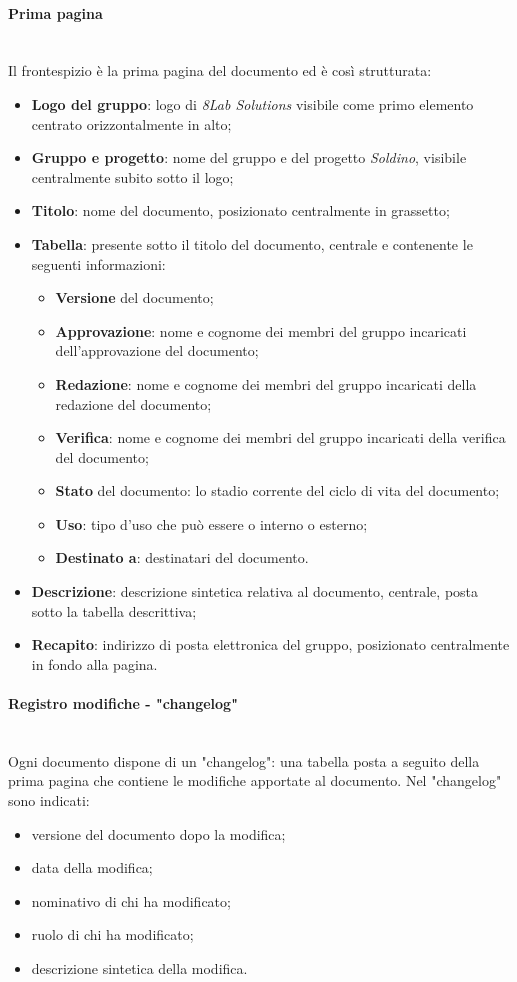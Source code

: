 		\paragraph{Prima pagina} \mbox{}\\
		Il frontespizio è la prima pagina del documento ed è così strutturata:
		\begin{itemize}
			\item \textbf{Logo del gruppo}: logo di \textit{8Lab Solutions} visibile come primo elemento centrato orizzontalmente in alto;
			\item \textbf{Gruppo e progetto}: nome del gruppo e del progetto \textit{Soldino}, visibile centralmente subito sotto il logo;
			\item \textbf{Titolo}: nome del documento, posizionato centralmente in grassetto;
			\item \textbf{Tabella}: presente sotto il titolo del documento, centrale e contenente le seguenti informazioni:
			\begin{itemize}
				\item \textbf{Versione} del documento;
				\item \textbf{Approvazione}: nome e cognome dei membri del gruppo incaricati dell'approvazione del documento;
				\item \textbf{Redazione}: nome e cognome dei membri del gruppo incaricati della redazione del documento;
				\item \textbf{Verifica}: nome e cognome dei membri del gruppo incaricati della verifica del documento;
				\item \textbf{Stato} del documento: lo stadio corrente del ciclo di vita del documento;
				\item \textbf{Uso}: tipo d'uso che può essere o interno o esterno;
				\item \textbf{Destinato a}: destinatari del documento.
			\end{itemize}
			\item \textbf{Descrizione}: descrizione sintetica relativa al documento, centrale, posta sotto la tabella descrittiva;
			\item \textbf{Recapito}: indirizzo di posta elettronica del gruppo, posizionato centralmente in fondo alla pagina.
		\end{itemize}
		\paragraph{Registro modifiche - "changelog"} \mbox{}\\
		Ogni documento dispone di un "changelog": una tabella posta a seguito della prima pagina che contiene le modifiche apportate al documento. Nel "changelog" sono indicati:
		\begin{itemize}
			\item versione del documento dopo la modifica;
			\item data della modifica;
			\item nominativo di chi ha modificato;
			\item ruolo di chi ha modificato;
			\item descrizione sintetica della modifica.
		\end{itemize}
